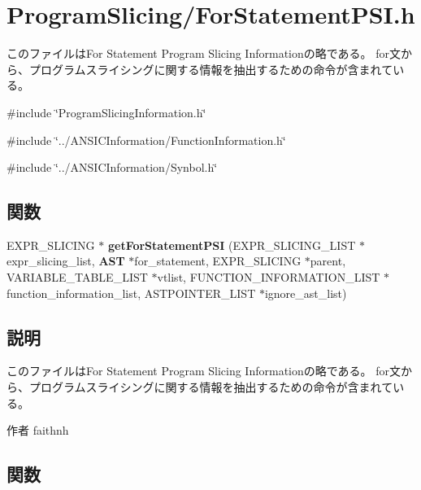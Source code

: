 \section{ProgramSlicing/ForStatementPSI.h}
\label{ForStatementPSI_8h}


このファイルはFor Statement Program Slicing Informationの略である。 for文から、プログラムスライシングに関する情報を抽出するための命令が含まれている。  


{\ttfamily \#include \char`\"{}ProgramSlicingInformation.h\char`\"{}}\par
{\ttfamily \#include \char`\"{}../ANSICInformation/FunctionInformation.h\char`\"{}}\par
{\ttfamily \#include \char`\"{}../ANSICInformation/Synbol.h\char`\"{}}\par
\subsection*{関数}
\begin{DoxyCompactItemize}
\item 
EXPR\_\-SLICING $\ast$ {\bf getForStatementPSI} (EXPR\_\-SLICING\_\-LIST $\ast$expr\_\-slicing\_\-list, {\bf AST} $\ast$for\_\-statement, EXPR\_\-SLICING $\ast$parent, VARIABLE\_\-TABLE\_\-LIST $\ast$vtlist, FUNCTION\_\-INFORMATION\_\-LIST $\ast$function\_\-information\_\-list, ASTPOINTER\_\-LIST $\ast$ignore\_\-ast\_\-list)
\end{DoxyCompactItemize}


\subsection{説明}
このファイルはFor Statement Program Slicing Informationの略である。 for文から、プログラムスライシングに関する情報を抽出するための命令が含まれている。 \begin{DoxyAuthor}{作者}
faithnh 
\end{DoxyAuthor}


\subsection{関数}
